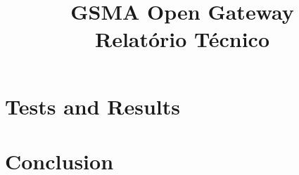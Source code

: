 \documentclass[code,math,bibliography]{relatorio-deti}
\title{GSMA Open Gateway\\[20pt]Relatório Técnico}
\begin{document}
\maketitle

%
%



\tableofcontents

\clearpage









\chapter{Tests and Results}

\chapter{Conclusion}

\printbibliography[heading=bibintoc]
\end{document}
